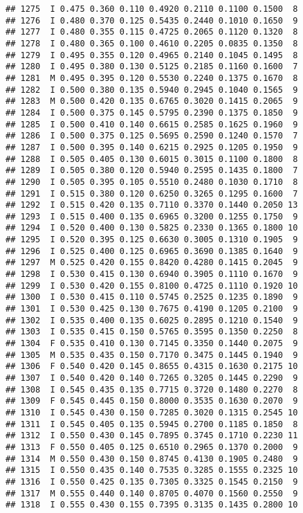 \documentclass[
]{article}
\begin{document}
\begin{verbatim}
## 1275  I 0.475 0.360 0.110 0.4920 0.2110 0.1100 0.1500  8
## 1276  I 0.480 0.370 0.125 0.5435 0.2440 0.1010 0.1650  9
## 1277  I 0.480 0.355 0.115 0.4725 0.2065 0.1120 0.1320  8
## 1278  I 0.480 0.365 0.100 0.4610 0.2205 0.0835 0.1350  8
## 1279  I 0.495 0.355 0.120 0.4965 0.2140 0.1045 0.1495  8
## 1280  I 0.495 0.380 0.130 0.5125 0.2185 0.1160 0.1600  7
## 1281  M 0.495 0.395 0.120 0.5530 0.2240 0.1375 0.1670  8
## 1282  I 0.500 0.380 0.135 0.5940 0.2945 0.1040 0.1565  9
## 1283  M 0.500 0.420 0.135 0.6765 0.3020 0.1415 0.2065  9
## 1284  I 0.500 0.375 0.145 0.5795 0.2390 0.1375 0.1850  9
## 1285  I 0.500 0.410 0.140 0.6615 0.2585 0.1625 0.1960  9
## 1286  I 0.500 0.375 0.125 0.5695 0.2590 0.1240 0.1570  7
## 1287  I 0.500 0.395 0.140 0.6215 0.2925 0.1205 0.1950  9
## 1288  I 0.505 0.405 0.130 0.6015 0.3015 0.1100 0.1800  8
## 1289  I 0.505 0.380 0.120 0.5940 0.2595 0.1435 0.1800  7
## 1290  I 0.505 0.395 0.105 0.5510 0.2480 0.1030 0.1710  8
## 1291  I 0.515 0.380 0.120 0.6250 0.3265 0.1295 0.1600  7
## 1292  I 0.515 0.420 0.135 0.7110 0.3370 0.1440 0.2050 13
## 1293  I 0.515 0.400 0.135 0.6965 0.3200 0.1255 0.1750  9
## 1294  I 0.520 0.400 0.130 0.5825 0.2330 0.1365 0.1800 10
## 1295  I 0.520 0.395 0.125 0.6630 0.3005 0.1310 0.1905  9
## 1296  I 0.525 0.400 0.125 0.6965 0.3690 0.1385 0.1640  9
## 1297  M 0.525 0.420 0.155 0.8420 0.4280 0.1415 0.2045  9
## 1298  I 0.530 0.415 0.130 0.6940 0.3905 0.1110 0.1670  9
## 1299  I 0.530 0.420 0.155 0.8100 0.4725 0.1110 0.1920 10
## 1300  I 0.530 0.415 0.110 0.5745 0.2525 0.1235 0.1890  9
## 1301  I 0.530 0.425 0.130 0.7675 0.4190 0.1205 0.2100  9
## 1302  I 0.535 0.400 0.135 0.6025 0.2895 0.1210 0.1540  9
## 1303  I 0.535 0.415 0.150 0.5765 0.3595 0.1350 0.2250  8
## 1304  F 0.535 0.410 0.130 0.7145 0.3350 0.1440 0.2075  9
## 1305  M 0.535 0.435 0.150 0.7170 0.3475 0.1445 0.1940  9
## 1306  F 0.540 0.420 0.145 0.8655 0.4315 0.1630 0.2175 10
## 1307  I 0.540 0.420 0.140 0.7265 0.3205 0.1445 0.2290  9
## 1308  I 0.545 0.435 0.135 0.7715 0.3720 0.1480 0.2270  8
## 1309  F 0.545 0.445 0.150 0.8000 0.3535 0.1630 0.2070  9
## 1310  I 0.545 0.430 0.150 0.7285 0.3020 0.1315 0.2545 10
## 1311  I 0.545 0.405 0.135 0.5945 0.2700 0.1185 0.1850  8
## 1312  I 0.550 0.430 0.145 0.7895 0.3745 0.1710 0.2230 11
## 1313  F 0.550 0.405 0.125 0.6510 0.2965 0.1370 0.2000  9
## 1314  M 0.550 0.430 0.150 0.8745 0.4130 0.1905 0.2480  9
## 1315  I 0.550 0.435 0.140 0.7535 0.3285 0.1555 0.2325 10
## 1316  I 0.550 0.425 0.135 0.7305 0.3325 0.1545 0.2150  9
## 1317  M 0.555 0.440 0.140 0.8705 0.4070 0.1560 0.2550  9
## 1318  I 0.555 0.430 0.155 0.7395 0.3135 0.1435 0.2800 10

\end{verbatim}
\end{document}
